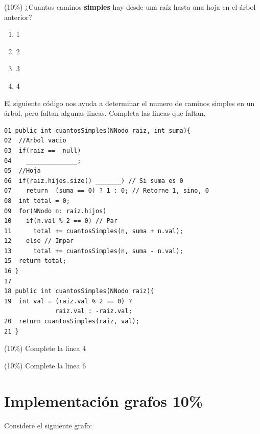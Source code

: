 \documentclass[twocolumn]{article}
\begin{document}
\begin{center}
\end{center}

(10\%) ¿Cuantos caminos \textbf{simples} hay desde una raíz hasta una hoja en el árbol anterior?
\begin{enumerate}[label=\Alph*]
\item 1
\item 2
\item 3
\item 4 \\
\end{enumerate}


El siguiente código nos ayuda a determinar el numero de caminos simples en un árbol, pero faltan algunas lineas. Completa las lineas que faltan.

{\small
\begin{verbatim}
01 public int cuantosSimples(NNodo raiz, int suma){
02  //Arbol vacio 
03  if(raiz ==  null)
04    ______________;
05  //Hoja
06  if(raiz.hijos.size() _______) // Si suma es 0
07    return  (suma == 0) ? 1 : 0; // Retorne 1, sino, 0
08  int total = 0;
09  for(NNodo n: raiz.hijos)
10    if(n.val % 2 == 0) // Par
11      total += cuantosSimples(n, suma + n.val);   
12    else // Impar
13      total += cuantosSimples(n, suma - n.val);   
15  return total;
16 }
17
18 public int cuantosSimples(NNodo raiz){
19  int val = (raiz.val % 2 == 0) ? 
              raiz.val : -raiz.val;
20  return cuantosSimples(raiz, val);
21 }
\end{verbatim}
}

 (10\%) Complete la linea 4 \hrulefill

 (10\%) Complete la linea 6 \hrulefill



\section{Implementación grafos 10\%}
Considere el siguiente grafo:
\end{document}
